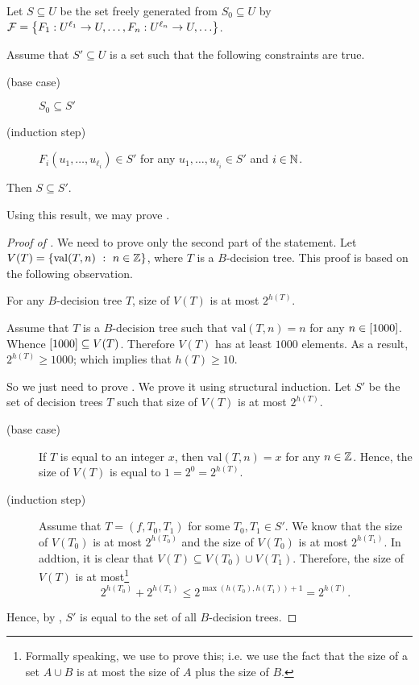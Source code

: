 \begin{theorem}
\label{theorem:structural-induction}
    Let $S \subseteq U$ be the set freely generated from $S_0 \subseteq U$ by
    $\mathcal{F} =
      \set{F_1 : U^{\ell_1} \to U, \dots, F_n : U^{\ell_n} \to U, \dots }$.

    Assume that $S' \subseteq U$ is a set such that the following constraints
    are true.
    \begin{description}
        \item [(base case)] $S_0 \subseteq S'$
        \item[(induction step)]
          $F_i(u_1, \dots, u_{\ell_i}) \in S'$ for any
          $u_1, \dots, u_{\ell_i} \in S'$ and $i \in {\mathbb{N}}$.
    \end{description}
    Then $S \subseteq S'$.
\end{theorem}

Using this result, we may prove .
\begin{proof}[Proof of ]
  We need to prove only the second part of the statement.
  Let $V(T) = \set[n \in \Z]{\mathrm{val}(T, n)}$, where $T$ is a $B$-decision
  tree. This proof is based on the following observation.
  \begin{claim}
  \label{claim:guess-the-number}
    For any $B$-decision tree $T$, size of $V(T)$ is at most $2^{h(T)}$.
  \end{claim}

  Assume that $T$ is a $B$-decision tree such that $\mathrm{val}(T, n) = n$ for
  any $n \in {[{1000}]}$. Whence ${[{1000}]} \subseteq V(T)$. Therefore 
  $V(T)$ has at least $1000$ elements. As a result, $2^{h(T)} \ge 1000$;
  which implies that $h(T) \ge 10$.

  So we just need to prove . We prove it using
  structural induction. Let $S'$ be the set of decision trees $T$ such that size
  of $V(T)$ is at most $2^{h(T)}$.
  \begin{description}
    \item[(base case)] If $T$ is equal to an integer $x$, then 
      $\mathrm{val}(T, n) = x$ for any $n \in {\mathbb{Z}}$. Hence, the size of $V(T)$ is
      equal to $1 = 2^0 = 2^{h(T)}$.
    \item[(induction step)] Assume that $T = (f, T_0, T_1)$ for some 
      $T_0, T_1 \in S'$. We know that the size of $V(T_0)$ is at most
      $2^{h(T_0)}$ and the size of $V(T_0)$ is at most $2^{h(T_1)}$. In 
      addtion, it is clear that $V(T) \subseteq V(T_0) \cup V(T_1)$. Therefore,
      the size of $V(T)$ is at most\footnote{%
        Formally speaking, we use  to prove
        this; i.e. we use the fact that the size of a set $A \cup B$ is at most
        the size of $A$ plus the size of $B$.
      }
      \[
        2^{h(T_0)} + 2^{h(T_1)} \le 2^{\max(h(T_0), h(T_1)) + 1} = 2^{h(T)}.
      \]
  \end{description}
  Hence, by , $S'$ is equal to the set of all
  $B$-decision trees.
\end{proof}

